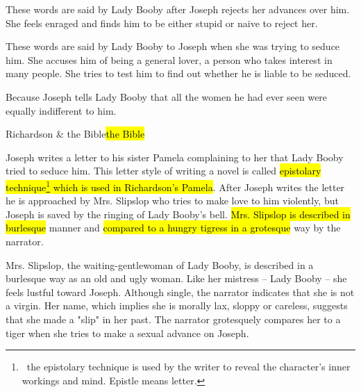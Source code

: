 \documentclass[12pt, a4paper]{article}
\begin{document}


These words are said by Lady Booby after Joseph rejects her advances over him.
She feels enraged and finds him to be either stupid or naive to reject her.


These words are said by Lady Booby to Joseph when she was trying to seduce him. She 
accuses him of being a general lover, a person who takes interest in many people. She
tries to test him to find out whether he is liable to be seduced.


Because Joseph tells Lady Booby that all the women he had ever seen were
equally indifferent to him.

{Richardson \& the Bible}{\hl{the Bible}}



\ind Joseph writes a letter to his sister Pamela complaining to her that Lady Booby tried to seduce him.
This letter style of writing a novel is called \hl{epistolary technique\footnote{\, the epistolary technique is used by the writer 
to reveal the character's inner workings and mind. Epistle means letter.} which is used in Richardson's
Pamela}. After Joseph writes the letter he is approached by Mrs. Slipslop who tries to make
love to him violently, but Joseph is saved by the ringing of Lady Booby's bell. \hl{Mrs. Slipslop
is described in burlesque} manner and \hl{compared to a hungry tigress in a grotesque} way by the narrator. 


\ind Mrs. Slipslop, the waiting-gentlewoman of Lady Booby, is described in a burlesque way as an old and ugly woman.
Like her mistress -- Lady Booby --
she feels lustful toward Joseph. Although single,
the narrator indicates that she is not a virgin. Her name, which implies she is morally lax, sloppy or careless, 
suggests that she made a "slip" in her past.
The narrator grotesquely compares her to a tiger when she tries to make a sexual advance on Joseph.
\end{document}
